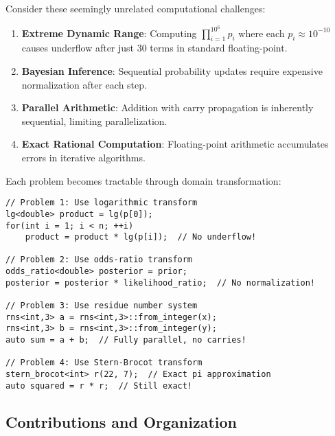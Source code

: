 \documentclass[12pt,a4paper]{article}
\theoremstyle{definition}
\begin{document}
Consider these seemingly unrelated computational challenges:

\begin{enumerate}
\item \textbf{Extreme Dynamic Range}: Computing $\prod_{i=1}^{10^6} p_i$ where each $p_i \approx 10^{-10}$ causes underflow after just 30 terms in standard floating-point.

\item \textbf{Bayesian Inference}: Sequential probability updates require expensive normalization after each step.

\item \textbf{Parallel Arithmetic}: Addition with carry propagation is inherently sequential, limiting parallelization.

\item \textbf{Exact Rational Computation}: Floating-point arithmetic accumulates errors in iterative algorithms.
\end{enumerate}

Each problem becomes tractable through domain transformation:

\begin{lstlisting}[caption={Solutions through CBTs},label={lst:solutions}]
// Problem 1: Use logarithmic transform
lg<double> product = lg(p[0]);
for(int i = 1; i < n; ++i)
    product = product * lg(p[i]);  // No underflow!

// Problem 2: Use odds-ratio transform  
odds_ratio<double> posterior = prior;
posterior = posterior * likelihood_ratio;  // No normalization!

// Problem 3: Use residue number system
rns<int,3> a = rns<int,3>::from_integer(x);
rns<int,3> b = rns<int,3>::from_integer(y);
auto sum = a + b;  // Fully parallel, no carries!

// Problem 4: Use Stern-Brocot transform
stern_brocot<int> r(22, 7);  // Exact pi approximation
auto squared = r * r;  // Still exact!
\end{lstlisting}

\subsection{Contributions and Organization}
\end{document}
